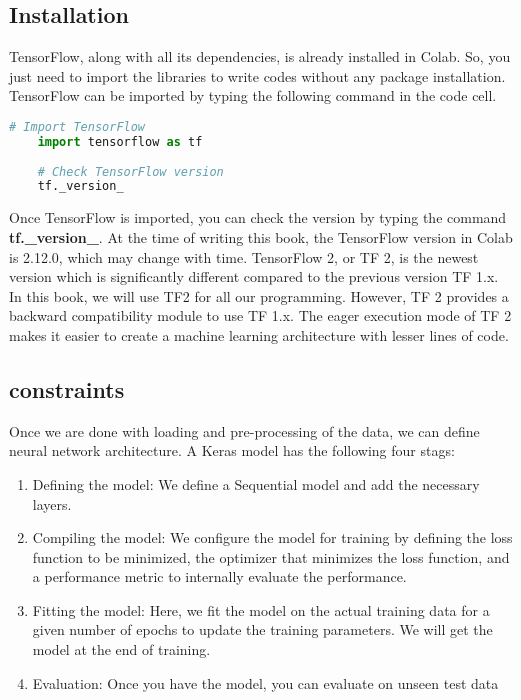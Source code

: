 \subsection{Installation}

TensorFlow, along with all its dependencies, is already installed in Colab. So, you just need to import the libraries to write codes without any package installation. TensorFlow can be imported by typing the following command in the code cell.


\begin{lstlisting}[language=Python, caption={Import TensorFlow and Check Version}, label={code:tensorflow-version}, style=pythonstyle]
	# Import TensorFlow
	import tensorflow as tf
	
	# Check TensorFlow version
	tf._version_
\end{lstlisting}


Once TensorFlow is imported, you can check the version by typing the command \textbf{tf.\_version\_}. At the time of writing this book, the TensorFlow version in Colab is 2.12.0, which may change with time. TensorFlow 2, or TF 2, is the newest version which is significantly different compared to the previous version TF 1.x. In this book, we will use TF2 for all our programming. However, TF 2 provides a backward compatibility module to use TF 1.x. The eager execution mode of TF 2 makes it easier to create a machine learning architecture with lesser lines of code. \cite{TensorFlow:2023} 


\subsection{constraints}

Once we are done with loading and pre-processing of the data, we can define neural network architecture.
A Keras model has the following four stags:

\begin{enumerate}
	
	\item Defining the model: We define a Sequential model and add the necessary layers.
	
	\item Compiling the model: We configure the model for training by defining the loss function to be minimized, the optimizer that minimizes the loss function, and a performance metric to internally evaluate the performance. 
	
	\item Fitting the model: Here, we fit the model on the actual training data for a given number of epochs to update the training parameters. We will get the model at the end of training.
	
	\item Evaluation: Once you have the model, you can evaluate on unseen test data
	
\end{enumerate}


